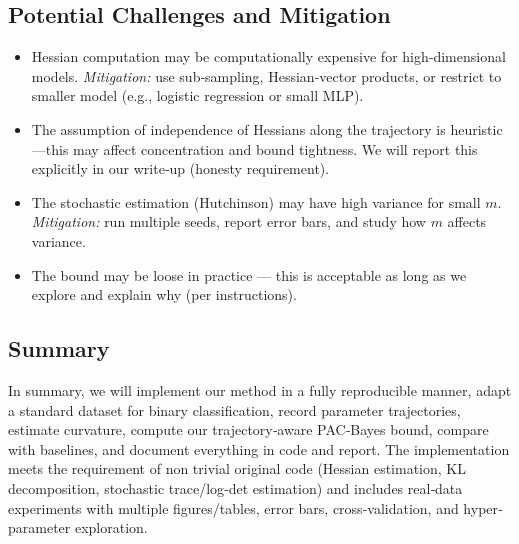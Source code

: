 \subsection{Potential Challenges and Mitigation}

\begin{itemize}[noitemsep]
  \item Hessian computation may be computationally expensive for high‑dimensional models. \emph{Mitigation:} use sub‑sampling, Hessian‐vector products, or restrict to smaller model (e.g., logistic regression or small MLP).  
  \item The assumption of independence of Hessians along the trajectory is heuristic—this may affect concentration and bound tightness. We will report this explicitly in our write‑up (honesty requirement).  
  \item The stochastic estimation (Hutchinson) may have high variance for small \(m\). \emph{Mitigation:} run multiple seeds, report error bars, and study how \(m\) affects variance.  
  \item The bound may be loose in practice — this is acceptable as long as we explore and explain why (per instructions).  
\end{itemize}

\subsection{Summary}

In summary, we will implement our method in a fully reproducible manner, adapt a standard dataset for binary classification, record parameter trajectories, estimate curvature, compute our trajectory‐aware PAC‑Bayes bound, compare with baselines, and document everything in code and report. The implementation meets the requirement of non trivial original code (Hessian estimation, KL decomposition, stochastic trace/log‑det estimation) and includes real‐data experiments with multiple figures/tables, error bars, cross‐validation, and hyper‐parameter exploration.